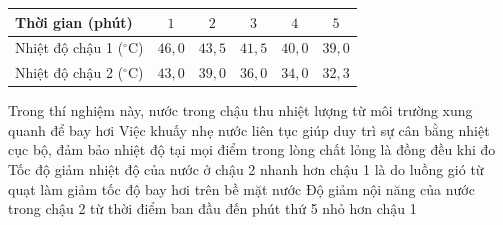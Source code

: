 \begin{ex}
\begin{minipage}[c]{0.62\linewidth}
{\begin{tabular}{|l|c|c|c|c|c|}
				\hline
				Thời gian (phút) & $1$ & $2$ & $3$ & $4$ & $5$\\ \hline
				Nhiệt độ chậu 1 ($^\circ$C) & $46{,}0$ & $43{,}5$ & $41{,}5$ & $40{,}0$ & $39{,}0$\\ \hline
				Nhiệt độ chậu 2 ($^\circ$C) & $43{,}0$ & $39{,}0$ & $36{,}0$ & $34{,}0$ & $32{,}3$\\ \hline
			\end{tabular}}
		\end{minipage}
		\choiceTFt
		{Trong thí nghiệm này, nước trong chậu thu nhiệt lượng từ môi trường xung quanh để bay hơi}
		{\True Việc khuấy nhẹ nước liên tục giúp duy trì sự cân bằng nhiệt cục bộ, đảm bảo nhiệt độ tại mọi điểm trong lòng chất lỏng là đồng đều khi đo}
		{Tốc độ giảm nhiệt độ của nước ở chậu 2 nhanh hơn chậu 1 là do luồng gió từ quạt làm giảm tốc độ bay hơi trên bề mặt nước}
		{Độ giảm nội năng của nước trong chậu 2 từ thời điểm ban đầu đến phút thứ 5 nhỏ hơn chậu 1}
	\end{ex}

